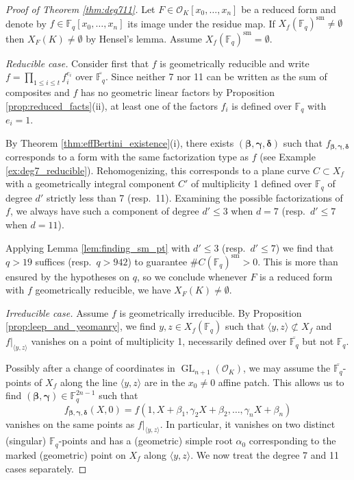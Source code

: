 \documentclass{amsart}
\newcommand{\F}{\mathbb{F}}
\renewcommand{\O}{\mathcal{O}}
\newcommand{\Span}[1]{\langle #1 \rangle}
\newcommand{\sm}{\mathrm{sm}}
\renewcommand{\v}{\beta}
\newcommand{\w}{\gamma}
\newcommand{\z}{\delta}
\newcommand{\bv}{\boldsymbol{\v}}
\newcommand{\bw}{\boldsymbol{\w}}
\newcommand{\bz}{\boldsymbol{\z}}
\newcommand{\fvwz}{f_{\bv, \bw, \bz}}
\DeclareMathOperator{\GL}{GL}
\theoremstyle{definition}
\numberwithin{equation}{section}
\numberwithin{table}{section}
\newcommand{\qbound}[1]{{\color{cyan}$q > {#1}$}}
\renewcommand{\qbound}[1]{{$q > {#1}$}}
\begin{document}
\begin{proof}[Proof of Theorem \ref{thm:deg711}]
	Let $F \in \O_K[x_0, \ldots, x_n]$ be a reduced form and denote by $f \in \F_q[x_0, \ldots, x_n]$ its image under the residue map. If $X_f(\F_q)^{\sm} \neq \emptyset$ then $X_F(K) \neq \emptyset$ by Hensel's lemma. Assume $X_f(\F_q)^{\sm} = \emptyset$. 
	
	\bigskip
	\noindent\textit{Reducible case.} Consider first that $f$ is geometrically reducible and write $f = \prod_{1 \leq i \leq t} f_i^{e_i}$ over $\overline{\F_q}$. Since neither 7 nor 11 can be written as the sum of composites and $f$ has no geometric linear factors by Proposition \ref{prop:reduced_facts}(ii), at least one of the factors $f_i$ is defined over $\F_q$ with $e_i = 1$.
	
	By Theorem \ref{thm:effBertini_existence}(i), there exists $(\bv,\bw,\bz)$ such that $\fvwz$ corresponds to a form with the same factorization type as $f$ (see Example \ref{ex:deg7_reducible}). Rehomogenizing, this corresponds to a plane curve $C \subset X_f$ with a geometrically integral component $C'$ of multiplicity 1 defined over $\F_q$ of degree $d'$ strictly less than 7 (resp.\ 11). Examining the possible factorizations of $f$, we always have such a component of degree $d' \leq 3$ when $d=7$ (resp.\ $d' \leq 7$ when $d=11$).
	
	Applying Lemma \ref{lem:finding_sm_pt} with $d'\leq 3$ (resp.\ $d' \leq 7$) we find that \qbound{19} suffices (resp.\ \qbound{942}) to guarantee $\#C(\F_q)^\sm > 0$. This is more than ensured by the hypotheses on $q$, so we conclude whenever $F$ is a reduced form with $f$ geometrically reducible, we have $X_F(K) \neq \emptyset$.
	
	\bigskip
	\noindent\textit{Irreducible case.} Assume $f$ is geometrically irreducible. By Proposition \ref{prop:leep_and_yeomanry}, we find $y,z \in X_f(\F_q)$ such that $\Span{y,z} \not\subset X_f$ and $f|_{\Span{y,z}}$ vanishes on a point of multiplicity 1, necessarily defined over $\overline{\F_q}$ but not $\F_q$.
	
	Possibly after a change of coordinates in $\GL_{n+1}(\O_K)$, we may assume the $\overline{\F_q}$-points of $X_f$ along the line $\Span{y,z}$ are in the $x_0 \neq 0$ affine patch. This allows us to find $(\bv, \bw) \in \F_q^{2n-1}$ such that 
    \[f_{\bv, \bw, \bz}(X,0) = f(1, X +\v_1,\w_2X +\v_2, \ldots,\w_nX +\v_n)\] 
    vanishes on the same points as $f|_{\Span{y,z}}$. In particular, it vanishes on two distinct (singular) $\F_q$-points and has a (geometric) simple root $\alpha_0$ corresponding to the marked (geometric) point on $X_f$ along $\Span{y,z}$. We now treat the degree 7 and 11 cases separately.
    

\end{proof}
\end{document}
